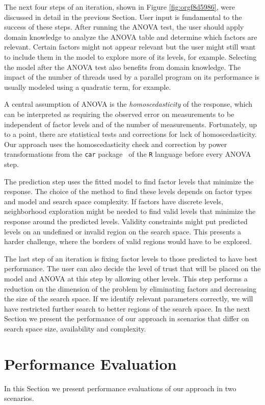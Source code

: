 \documentclass[conference]{IEEEtran}
\begin{document}
The next four steps of an iteration, shown in Figure \ref{fig:orgf8d5986},
were discussed in detail in the previous Section. User input is fundamental to
the success of these steps. After running the ANOVA test, the user should apply
domain knowledge to analyze the ANOVA table and determine which factors are
relevant. Certain factors might not appear relevant but the user might still
want to include them in the model to explore more of its levels, for example.
Selecting the model after the ANOVA test also benefits from domain knowledge.
The impact of the number of threads used by a parallel program on its
performance is usually modeled using a quadratic term, for example.

A central assumption of ANOVA is the \emph{homoscedasticity} of the response, which
can be interpreted as requiring the observed error on measurements to be
independent of factor levels and of the number of measurements. Fortunately, up
to a point, there are statistical tests and corrections for lack of
homoscedasticity. Our approach uses the homoscedasticity check and correction by
power transformations from the \texttt{car} package~\cite{fox2011car} of the \texttt{R}
language before every ANOVA step.

The prediction step uses the fitted model to find factor levels that minimize
the response. The choice of the method to find these levels depends on factor
types and model and search space complexity. If factors have discrete levels,
neighborhood exploration might be needed to find valid levels that minimize the
response around the predicted levels. Validity constraints might put predicted
levels on an undefined or invalid region on the search space. This presents a
harder challenge, where the borders of valid regions would have to be explored.

The last step of an iteration is fixing factor levels to those predicted to have
best performance. The user can also decide the level of trust that will be
placed on the model and ANOVA at this step by allowing other levels. This step
performs a reduction on the dimension of the problem by eliminating factors and
decreasing the size of the search space. If we identify relevant parameters
correctly, we will have restricted further search to better regions of the
search space. In the next Section we present the performance of our approach in
scenarios that differ on search space size, availability and complexity.
\section{Performance Evaluation}
\label{sec:orgea310e3}
In this Section we present performance evaluations of our approach in two
scenarios.
\end{document}
